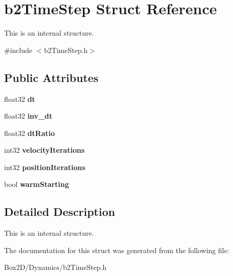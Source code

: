 \hypertarget{structb2_time_step}{}\section{b2\+Time\+Step Struct Reference}
\label{structb2_time_step}


This is an internal structure.  




{\ttfamily \#include $<$b2\+Time\+Step.\+h$>$}

\subsection*{Public Attributes}
\begin{DoxyCompactItemize}
\item 
\mbox{\label{structb2_time_step_a74e20836809accba98a4445fbcb3427c}} 
float32 {\bfseries dt}
\item 
\mbox{\label{structb2_time_step_ac2d652bde6d303149db9d0a461bc22ba}} 
float32 {\bfseries inv\+\_\+dt}
\item 
\mbox{\label{structb2_time_step_aa67bc8a12ffafce918d9e6a0d8d3f203}} 
float32 {\bfseries dt\+Ratio}
\item 
\mbox{\label{structb2_time_step_a9f2a0ccd8029681f254003b66f201ce1}} 
int32 {\bfseries velocity\+Iterations}
\item 
\mbox{\label{structb2_time_step_ab7938eec17a1a3d7961d8364e150f1be}} 
int32 {\bfseries position\+Iterations}
\item 
\mbox{\label{structb2_time_step_add80f7f86c84f005ad817f0313df3f32}} 
bool {\bfseries warm\+Starting}
\end{DoxyCompactItemize}


\subsection{Detailed Description}
This is an internal structure. 

The documentation for this struct was generated from the following file\+:\begin{DoxyCompactItemize}
\item 
Box2\+D/\+Dynamics/b2\+Time\+Step.\+h\end{DoxyCompactItemize}
